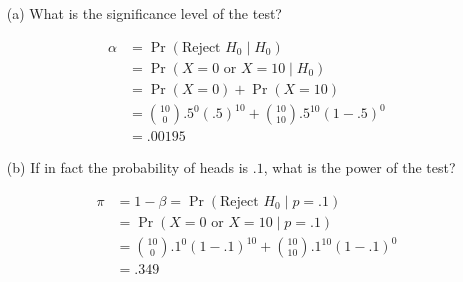 \documentclass{tufte-book}
\begin{document}
\begin{enumerate}

\item[(a)] What is the significance level of the test?

\begin{align*}
\alpha &= \Pr(\text{Reject }H_0 \mid H_0)\\
&= \Pr(X=0 \text{ or } X=10 \mid H_0)\\
&= \Pr(X=0) + \Pr(X=10)\\
&= \binom{10}{0}.5^0(.5)^{10} + \binom{10}{10}.5^{10}(1-.5)^0\\
&= .00195
\end{align*}

\item[(b)] If in fact the probability of heads is $.1$, what is the power of the test?

\begin{align*}
\pi &= 1-\beta = \Pr(\text{Reject }H_0 \mid p=.1)\\
&= \Pr(X=0 \text{ or } X=10 \mid p=.1)\\
&= \binom{10}{0}.1^0(1-.1)^{10} + \binom{10}{10}.1^{10}(1-.1)^0\\
&= .349
\end{align*}


\end{enumerate}
\end{document}
